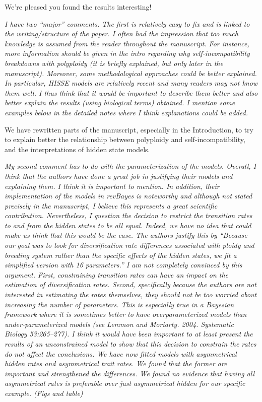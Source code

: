 \documentclass[11pt]{article}
\renewenvironment{quote}{\bigskip\noindent\itshape\ignorespaces}{\smallskip}
\begin{document}
We're pleased you found the results interesting!

\begin{quote}
I have two ``major'' comments.
The first is relatively easy to fix and is linked to the writing/structure of the paper.
I often had the impression that too much knowledge is assumed from the reader throughout the manuscript.
For instance, more information should be given in the intro regarding why self-incompatibility breakdowns with polyploidy (it is briefly explained, but only later in the manuscript).
Moreover, some methodological approaches could be better explained.
In particular, HISSE models are relatively recent and many readers may not know them well.
I thus think that it would be important to describe them better and also better explain the results (using biological terms) obtained.
I mention some examples below in the detailed notes where I think explanations could be added.
\end{quote}

We have rewritten parts of the manuscript, especially in the Introduction, to try to explain better the relationship between polyploidy and self-incompatibility, and the interpretations of hidden state models.

\begin{quote}
My second comment has to do with the parameterization of the models.
Overall, I think that the authors have done a great job in justifying their models and explaining them.
I think it is important to mention.
In addition, their implementation of the models in revBayes is noteworthy and although not stated precisely in the manuscript, I believe this represents a great scientific contribution. 
Nevertheless, I question the decision to restrict the transition rates to and from the hidden states to be all equal.
Indeed, we have no idea that could make us think that this would be the case.
The authors justify this by ``Because our goal was to look for diversification rate differences associated with ploidy and breeding system rather than the specific effects of the hidden states, we fit a simplified version with 16 parameters.''
I am not completely convinced by this argument.
First, constraining transition rates can have an impact on the estimation of diversification rates.
Second, specifically because the authors are not interested in estimating the rates themselves, they should not be too worried about increasing the number of parameters.
This is especially true in a Bayesian framework where it is sometimes better to have overparameterized models than under-parameterized models (see Lemmon and Moriarty. 2004. Systematic Biology 53:265–277).
I think it would have been important to at least present the results of an unconstrained model to show that this decision to constrain the rates do not affect the conclusions.
\end{quote}
We have now fitted models with asymmetrical hidden rates and asymmetrical trait rates. We found that the former are important and strengthened the differences. We found no evidence that having all asymmetrical rates is preferable over just asymmetrical hidden for our specific example. (Figs and table)
\end{document}
